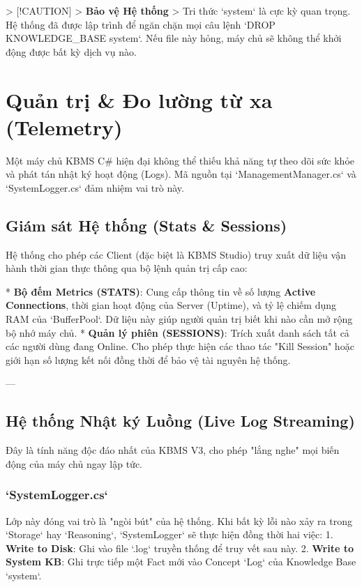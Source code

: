 > [!CAUTION]
> \textbf{Bảo vệ Hệ thống}
> Tri thức `system` là cực kỳ quan trọng. Hệ thống đã được lập trình để ngăn chặn mọi câu lệnh `DROP KNOWLEDGE\_BASE system`. Nếu file này hỏng, máy chủ sẽ không thể khởi động được bất kỳ dịch vụ nào.

\section{Quản trị & Đo lường từ xa (Telemetry)}

Một máy chủ KBMS C\# hiện đại không thể thiếu khả năng tự theo dõi sức khỏe và phát tán nhật ký hoạt động (Logs). Mã nguồn tại `ManagementManager.cs` và `SystemLogger.cs` đảm nhiệm vai trò này.

\subsection{Giám sát Hệ thống (Stats & Sessions)}

Hệ thống cho phép các Client (đặc biệt là KBMS Studio) truy xuất dữ liệu vận hành thời gian thực thông qua bộ lệnh quản trị cấp cao:

*   \textbf{Bộ đếm Metrics (STATS)}: 
    Cung cấp thông tin về số lượng \textbf{Active Connections}, thời gian hoạt động của Server (Uptime), và tỷ lệ chiếm dụng RAM của `BufferPool`. Dữ liệu này giúp người quản trị biết khi nào cần mở rộng bộ nhớ máy chủ.
*   \textbf{Quản lý phiên (SESSIONS)}: 
    Trích xuất danh sách tất cả các người dùng đang Online. Cho phép thực hiện các thao tác "Kill Session" hoặc giới hạn số lượng kết nối đồng thời để bảo vệ tài nguyên hệ thống.

---

\subsection{Hệ thống Nhật ký Luồng (Live Log Streaming)}

Đây là tính năng độc đáo nhất của KBMS V3, cho phép "lắng nghe" mọi biến động của máy chủ ngay lập tức.

\subsubsection{`SystemLogger.cs`}
Lớp này đóng vai trò là "ngòi bút" của hệ thống. Khi bất kỳ lỗi nào xảy ra trong `Storage` hay `Reasoning`, `SystemLogger` sẽ thực hiện đồng thời hai việc:
1.  \textbf{Write to Disk}: Ghi vào file `.log` truyền thống để truy vết sau này.
2.  \textbf{Write to System KB}: Ghi trực tiếp một Fact mới vào Concept `Log` của Knowledge Base `system`.

